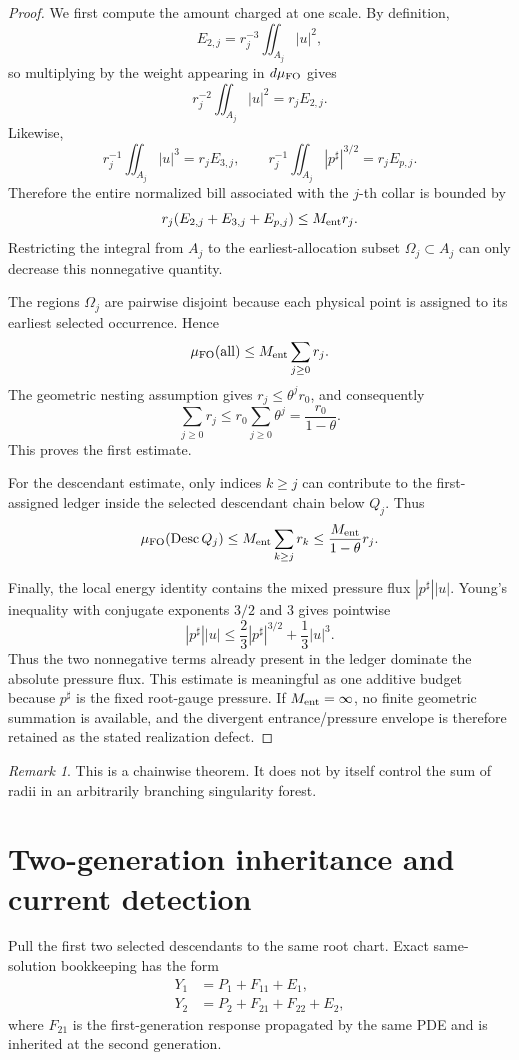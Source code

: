 \documentclass[11pt]{article}
\theoremstyle{definition}\newtheorem{problem}[theorem]{Problem}
\theoremstyle{definition}
\theoremstyle{remark}
\newtheorem{remark}[theorem]{Remark}
\begin{document}
\begin{proof}
We first compute the amount charged at one scale.  By definition,
\[
 E_{2,j}=r_j^{-3}\iint_{A_j}|u|^2,
\]
so multiplying by the weight appearing in \(d\mu_{\rm FO}\) gives
\[
 r_j^{-2}\iint_{A_j}|u|^2
 =r_jE_{2,j}.
\]
Likewise,
\[
 r_j^{-1}\iint_{A_j}|u|^3=r_jE_{3,j},
 \qquad
 r_j^{-1}\iint_{A_j}|p^\sharp|^{3/2}=r_jE_{p,j}.
\]
Therefore the entire normalized bill associated with the \(j\)-th collar is
bounded by
\[
 r_j(E_{2,j}+E_{3,j}+E_{p,j})
 \le M_{\rm ent}r_j.
\]
Restricting the integral from \(A_j\) to the earliest-allocation subset
\(\Omega_j\subset A_j\) can only decrease this nonnegative quantity.

The regions \(\Omega_j\) are pairwise disjoint because each physical point is
assigned to its earliest selected occurrence.  Hence
\[
 \mu_{\rm FO}(\mathrm{all})
 \le M_{\rm ent}\sum_{j\ge0}r_j.
\]
The geometric nesting assumption gives
\(r_j\le\theta^jr_0\), and consequently
\[
 \sum_{j\ge0}r_j
 \le r_0\sum_{j\ge0}\theta^j
 =\frac{r_0}{1-\theta}.
\]
This proves the first estimate.

For the descendant estimate, only indices \(k\ge j\) can contribute to the
first-assigned ledger inside the selected descendant chain below \(Q_j\).
Thus
\[
 \mu_{\rm FO}(\operatorname{Desc}Q_j)
 \le M_{\rm ent}\sum_{k\ge j}r_k
 \le \frac{M_{\rm ent}}{1-\theta}r_j.
\]

Finally, the local energy identity contains the mixed pressure flux
\(|p^\sharp||u|\).  Young's inequality with conjugate exponents
\(3/2\) and \(3\) gives pointwise
\[
 |p^\sharp||u|
 \le \frac23|p^\sharp|^{3/2}+\frac13|u|^3.
\]
Thus the two nonnegative terms already present in the ledger dominate the
absolute pressure flux.  This estimate is meaningful as one additive budget
because \(p^\sharp\) is the fixed root-gauge pressure.  If
\(M_{\rm ent}=\infty\), no finite geometric summation is available, and the
divergent entrance/pressure envelope is therefore retained as the stated
realization defect.
\end{proof}
\begin{remark}
This is a chainwise theorem.  It does not by itself control the sum of radii in
an arbitrarily branching singularity forest.
\end{remark}

\section{Two-generation inheritance and current detection}
\label{sec:gb19}
Pull the first two selected descendants to the same root chart.  Exact same-solution bookkeeping has the form
\[
\begin{aligned}
Y_1&=P_1+F_{11}+E_1,\\
Y_2&=P_2+F_{21}+F_{22}+E_2,
\end{aligned}
\]
where $F_{21}$ is the first-generation response propagated by the same PDE and is inherited at the second generation.
\end{document}
